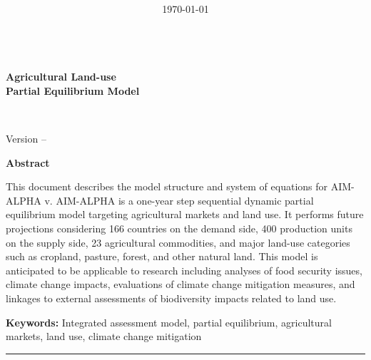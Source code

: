 \documentclass[11pt,a4paper,headings=small,parskip=half]{scrartcl}
\title{\doctitle\\\large \docsubtitle}
\author{\docauthor}
\date{\today}
\numberwithin{equation}{section}
\begin{document}
\begin{titlepage}
\centering
\vspace*{3cm}

{\Huge\bfseries \doctitle\\[0.5em]
\textcolor{Accent}{Agricultural Land-use\\Partial Equilibrium Model}}

\vspace{2cm}
{\Large \docauthor\\[0.5em]
\docorg}

\vfill
{\large  Version \docversion{} -- \docdate}
\end{titlepage}

\clearpage
\thispagestyle{empty} %

{\Large\bfseries \doctitle\par}
{\normalsize \docsubtitle\par}
\vspace{1.2em}

\textbf{Abstract}\par
\noindent
This document describes the model structure and system of equations for
AIM-ALPHA v\docversion. AIM-ALPHA is a one-year step
sequential dynamic partial equilibrium model targeting agricultural
markets and land use. It performs future projections considering 166
countries on the demand side, 400 production units on the supply side,
23 agricultural commodities, and major land-use categories such as
cropland, pasture, forest, and other natural land. This model is
anticipated to be applicable to research including analyses of food
security issues, climate change impacts, evaluations of climate change
mitigation measures, and linkages to external assessments of
biodiversity impacts related to land use.

\medskip
\textbf{Keywords:} Integrated assessment model, partial equilibrium, agricultural markets,
land use, climate change mitigation

\vfill

{\color{Accent}\rule{0.22\linewidth}{0.8pt}\par}\vspace{0.8ex}
\end{document}
